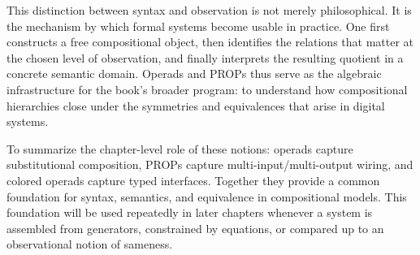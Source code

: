 This distinction between syntax and observation is not merely philosophical. It is the mechanism by which formal systems become usable in practice. One first constructs a free compositional object, then identifies the relations that matter at the chosen level of observation, and finally interprets the resulting quotient in a concrete semantic domain. Operads and PROPs thus serve as the algebraic infrastructure for the book’s broader program: to understand how compositional hierarchies close under the symmetries and equivalences that arise in digital systems.

To summarize the chapter-level role of these notions: operads capture substitutional composition, PROPs capture multi-input/multi-output wiring, and colored operads capture typed interfaces. Together they provide a common foundation for syntax, semantics, and equivalence in compositional models. This foundation will be used repeatedly in later chapters whenever a system is assembled from generators, constrained by equations, or compared up to an observational notion of sameness.
